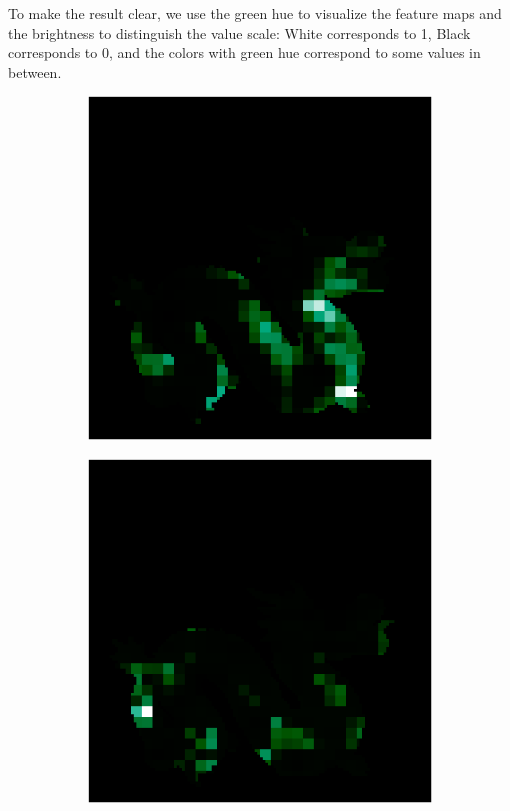 To make the result clear, we use the green hue to visualize the feature maps and the brightness to distinguish the value scale: White corresponds to 1, Black corresponds to 0, and the colors with green hue correspond to some values in between. 


\begin{figure}[H]
	\centering
	\captionsetup{width=\linewidth}
	\begin{minipage}{0.32\linewidth}
		\begin{subfigure}[t]{0.45\linewidth}
			\includegraphics[width=\linewidth]{./Figures/feature_map_gcnn/feature_map_gcnn-cnn_2.png}
		\end{subfigure}
		\begin{subfigure}[t]{0.45\linewidth}
			\includegraphics[width=\linewidth]{./Figures/feature_map_gcnn/feature_map_gcnn-cnn_46.png}

\end{subfigure}
\end{minipage}
\end{figure}
